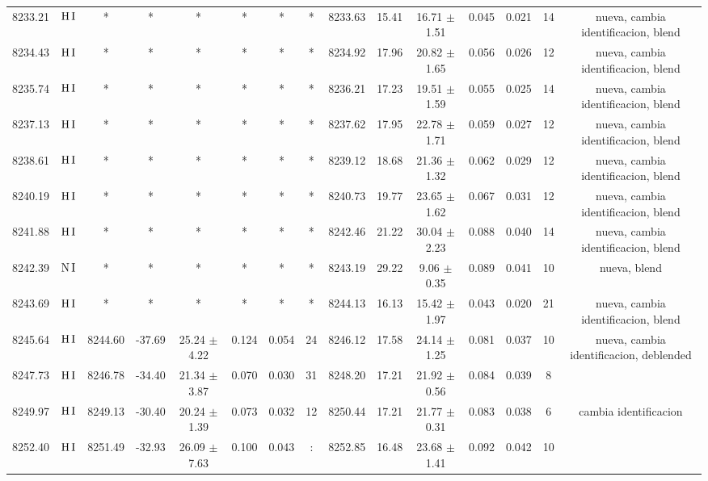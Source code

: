 \documentclass{article}
\begin{document}
\begin{table*}
\begin{adjustbox}{width=\textwidth}
\begin{tabular}{ccccccccccccccc}
8233.21 & $\mbox{H}\thinspace \mbox{I}$ & * & * & * & * & * & * & 8233.63 & 15.41 & 16.71 $\pm$ 1.51 & 0.045 & 0.021 & 14 &  nueva, cambia identificacion, blend \\
8234.43 & $\mbox{H}\thinspace \mbox{I}$ & * & * & * & * & * & * & 8234.92 & 17.96 & 20.82 $\pm$ 1.65 & 0.056 & 0.026 & 12 &  nueva, cambia identificacion, blend \\
8235.74 & $\mbox{H}\thinspace \mbox{I}$ & * & * & * & * & * & * & 8236.21 & 17.23 & 19.51 $\pm$ 1.59 & 0.055 & 0.025 & 14 &  nueva, cambia identificacion, blend \\
8237.13 & $\mbox{H}\thinspace \mbox{I}$ & * & * & * & * & * & * & 8237.62 & 17.95 & 22.78 $\pm$ 1.71 & 0.059 & 0.027 & 12 &  nueva, cambia identificacion, blend \\
8238.61 & $\mbox{H}\thinspace \mbox{I}$ & * & * & * & * & * & * & 8239.12 & 18.68 & 21.36 $\pm$ 1.32 & 0.062 & 0.029 & 12 &  nueva, cambia identificacion, blend \\
8240.19 & $\mbox{H}\thinspace \mbox{I}$ & * & * & * & * & * & * & 8240.73 & 19.77 & 23.65 $\pm$ 1.62 & 0.067 & 0.031 & 12 &  nueva, cambia identificacion, blend \\
8241.88 & $\mbox{H}\thinspace \mbox{I}$ & * & * & * & * & * & * & 8242.46 & 21.22 & 30.04 $\pm$ 2.23 & 0.088 & 0.040 & 14 &  nueva, cambia identificacion, blend \\
8242.39 & $\mbox{N}\thinspace \mbox{I}$ & * & * & * & * & * & * & 8243.19 & 29.22 & 9.06 $\pm$ 0.35 & 0.089 & 0.041 & 10 &  nueva, blend \\
8243.69 & $\mbox{H}\thinspace \mbox{I}$ & * & * & * & * & * & * & 8244.13 & 16.13 & 15.42 $\pm$ 1.97 & 0.043 & 0.020 & 21 &  nueva, cambia identificacion, blend \\
8245.64 & $\mbox{H}\thinspace \mbox{I}$ & 8244.60 & -37.69 & 25.24 $\pm$ 4.22 & 0.124 & 0.054 & 24 & 8246.12 & 17.58 & 24.14 $\pm$ 1.25 & 0.081 & 0.037 & 10 &  nueva, cambia identificacion, deblended \\
8247.73 & $\mbox{H}\thinspace \mbox{I}$ & 8246.78 & -34.40 & 21.34 $\pm$ 3.87 & 0.070 & 0.030 & 31 & 8248.20 & 17.21 & 21.92 $\pm$ 0.56 & 0.084 & 0.039 & 8 &  \\
8249.97 & $\mbox{H}\thinspace \mbox{I}$ & 8249.13 & -30.40 & 20.24 $\pm$ 1.39 & 0.073 & 0.032 & 12 & 8250.44 & 17.21 & 21.77 $\pm$ 0.31 & 0.083 & 0.038 & 6 &  cambia identificacion \\
8252.40 & $\mbox{H}\thinspace \mbox{I}$ & 8251.49 & -32.93 & 26.09 $\pm$ 7.63 & 0.100 & 0.043 & : & 8252.85 & 16.48 & 23.68 $\pm$ 1.41 & 0.092 & 0.042 & 10 &  \\

\end{tabular}
\end{adjustbox}
\end{table*}
\end{document}
